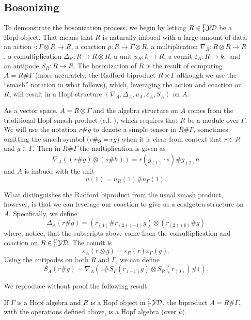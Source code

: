 \documentclass [11pt, proquest] {uwthesis}[2020/02/24]
\begin{document}
\subsection{Bosonizing}
    To demonstrate the bosonization process, we begin by letting $R\in{^\Gamma_\Gamma\mathcal{YD}}$ be a Hopf object. That means that $R$ is naturally imbued with a large amount of data: an action $\cdot:\Gamma\otimes R\to R$, a coaction $\rho:R\to \Gamma\otimes R$, a multiplication $\nabla_R:R\otimes R\to R$, a comultiplication $\Delta_R:R\to R\otimes R$, a unit $u_R:k\to R$, a counit $\varepsilon_R:R\to k,$ and an antipode $S_R:R\to R$. The bosonization of $R$ is the result of computing $A=R\#\Gamma$ (more accurately, the Radford biproduct $R\times \Gamma$ although we use the ``smash'' notation in what follows), which, leveraging the action and coaction on $R$, will result in a Hopf structure $(\nabla_A,\Delta_A,u_A,\varepsilon_A,S_A)$ on $A$.

    As a vector space, $A=R\otimes \Gamma$ and the algebra structure on $A$ comes from the traditional Hopf smash product (c.f. \cite{montgomery}), which requires that $R$ be a module over $\Gamma$. We will use the notation $r\# g$ to denote a simple tensor in $R\# \Gamma$, sometimes omitting the smash symbol ($r\#g=rg$) when it is clear from context that $r\in R$ and $g\in \Gamma.$ Then in $R\#\Gamma$ the multiplication is given as
    \[\nabla_A((r\# g)\otimes (s\# h))=r(g_{(1)}\cdot s)\# g_{(2)}h\]
    and $A$ is imbued with the unit
    \[u(1)=u_R(1)\# u_\Gamma(1).\]
    
    What distinguishes the Radford biproduct from the usual smash product, however, is that we can leverage our coaction to give us a coalgebra structure on $A$. Specifically, we define
    \[\Delta_A(r\# g)=(r_{(1)}\# r_{(2)(-1)}g)\otimes(r_{(2)(0)}\# g)\]
    where, notice, that the subscripts above come from the comultiplication and coaction on $R\in{^\Gamma_\Gamma\mathcal{YD}}.$ The counit is
    \[\varepsilon_A(r\otimes g)=\varepsilon_R(r)\varepsilon_\Gamma(g).\]
    Using the antipodes on both $R$ and $\Gamma$, we can define
    \[S_A(r\# g)=\nabla_A(1\#S_\Gamma(r_{(-1)}g)\otimes S_R(r_{(0)})\# 1).\]
    
    We reproduce without proof the following result:
    \begin{thm}
        If $\Gamma$ is a Hopf algebra and $R$ is a Hopf object in ${^\Gamma_\Gamma\mathcal{YD}}$, the biproduct $A=R\# \Gamma$, with the operations defined above, is a Hopf algebra (over $k$).
    \end{thm}
\end{document}
